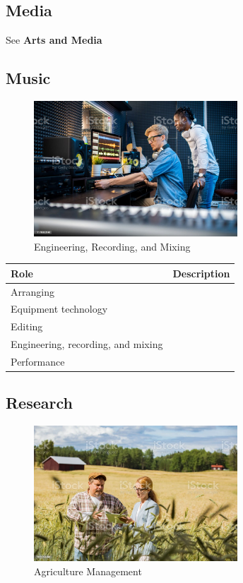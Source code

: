 \subsection{Media}
See \textbf{Arts and Media}

\subsection{Music}

\begin{figure}[H]
	\begin{center}
		\caption{Engineering, Recording, and Mixing}
		\vskip 4pt
		\includegraphics[height=2in]{images/careers/istockphoto-1176082646-1024x1024.jpg}
	\end{center}
\end{figure}

\begin{table}[H]
	\begin{center}
		\begin{tabular}{p{1.3in}|p{3in}} 
			\textbf{Role} & \textbf{Description}\\
			\hline
			Arranging & \\
			\hline
			Equipment technology & \\
			\hline
			Editing & \\
			\hline
			Engineering, recording, and mixing & \\
			\hline
			Performance & \\
		\end{tabular}
	\end{center}
\end{table}

\subsection{Research}

\begin{figure}[H]
	\begin{center}
		\caption{Agriculture Management}
		\vskip 4pt
		\includegraphics[height=2in]{images/careers/istockphoto-1272791496-1024x1024.jpg}
	\end{center}
\end{figure}

